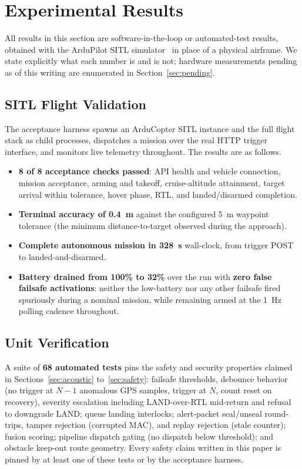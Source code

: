 \documentclass[journal]{IEEEtran}
\begin{document}
\section{Experimental Results}
\label{sec:results}

All results in this section are software-in-the-loop or automated-test
results, obtained with the ArduPilot SITL simulator~\cite{ardupilot} in
place of a physical airframe. We state explicitly what each number is and is
not; hardware measurements pending as of this writing are enumerated in
Section~\ref{sec:pending}.

\subsection{SITL Flight Validation}

The acceptance harness spawns an ArduCopter SITL instance and the full
flight stack as child processes, dispatches a mission over the real HTTP
trigger interface, and monitors live telemetry throughout. The results are
as follows.
\begin{itemize}
\item \textbf{8 of 8 acceptance checks passed}: API health and vehicle
connection, mission acceptance, arming and takeoff, cruise-altitude
attainment, target arrival within tolerance, hover phase, RTL, and
landed/disarmed completion.
\item \textbf{Terminal accuracy of 0.4~m} against the configured 5~m
waypoint tolerance (the minimum distance-to-target observed during the
approach).
\item \textbf{Complete autonomous mission in 328~s} wall-clock, from trigger
POST to landed-and-disarmed.
\item \textbf{Battery drained from 100\% to 32\%} over the run with
\textbf{zero false failsafe activations}: neither the low-battery nor any
other failsafe fired spuriously during a nominal mission, while remaining
armed at the 1~Hz polling cadence throughout.
\end{itemize}

\subsection{Unit Verification}

A suite of \textbf{68 automated tests} pins the safety and security
properties claimed in
Sections~\ref{sec:acoustic} to~\ref{sec:safety}: failsafe thresholds, debounce
behavior (no trigger at $N-1$ anomalous GPS samples, trigger at $N$, count
reset on recovery), severity escalation including LAND-over-RTL mid-return
and refusal to downgrade LAND; queue landing interlocks; alert-packet
seal/unseal round-trips, tamper rejection (corrupted MAC), and replay
rejection (stale counter); fusion scoring; pipeline dispatch gating (no
dispatch below threshold); and obstacle keep-out route geometry. Every
safety claim written in this paper is pinned by at least one of these tests
or by the acceptance harness.
\end{document}
